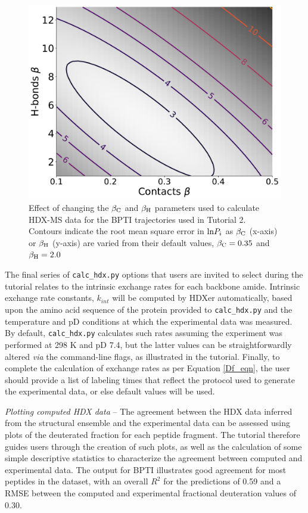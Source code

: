 \documentclass[9pt,tutorial,ASAPversion]{livecoms}
\begin{document}
\begin{figure}
    \includegraphics[width=0.98\linewidth]{Fig3_BPTI_noreweight_contour_plot_v2.pdf}
    \caption{Effect of changing the $\beta_\textnormal{C}$ and $\beta_\textnormal{H}$ parameters used to calculate HDX-MS data for the BPTI trajectories used in Tutorial 2. Contours indicate the root mean square error in $\textnormal{ln}{P_i}$ as $\beta_\textnormal{C}$ (x-axis) or $\beta_\textnormal{H}$ (y-axis) are varied from their default values, $\beta_\textnormal{C} = 0.35$ and $\beta_\textnormal{H} = 2.0$}
    \label{fig:contourplot}
\end{figure}

The final series of \texttt{calc\_hdx.py} options that users are invited to select during the tutorial relates to the intrinsic exchange rates for each backbone amide.
Intrinsic exchange rate constants, $k_{int}$ will be computed by HDXer automatically, based upon the amino acid sequence of the protein provided to \texttt{calc\_hdx.py} and the temperature and pD conditions at which the experimental data was measured. 
By default, \texttt{calc\_hdx.py} calculates such rates assuming the experiment was performed at 298 K and pD 7.4, but the latter values can be straightforwardly altered \textit{via} the command-line flags, as illustrated in the tutorial.
Finally, to complete the calculation of exchange rates as per Equation \ref{Df_eqn}, the user should provide a list of labeling times that reflect the protocol used to generate the experimental data, or else default values will be used.

\noindent
\textit{Plotting computed HDX data} -- The agreement between the HDX data inferred from the structural ensemble and the experimental data can be assessed using plots of the deuterated fraction for each peptide fragment.
The tutorial therefore guides users through the creation of such plots, as well as the calculation of some simple descriptive statistics to characterize the agreement between computed and experimental data. 
The output for BPTI illustrates good agreement for most peptides in the dataset, with an overall $R^2$ for the predictions of 0.59 and a RMSE between the computed and experimental fractional deuteration values of 0.30. 
\end{document}
